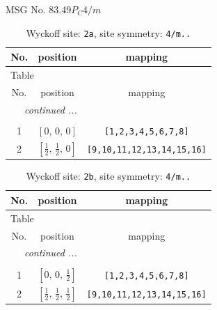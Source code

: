 \documentclass[fleqn,8pt]{jsarticle}
\begin{document}
\setcounter{MaxMatrixCols}{32}

\renewcommand{\tablename}{Table~}
\renewcommand{\figurename}{Figure~}
\begin{center}
\LARGE
MSG No. 83.49\quad$P_{C}4/m$
\end{center}
\renewcommand{\arraystretch}{1.2}
\begin{longtable}{ccc}
\caption{Wyckoff site: {\tt 2a}, site symmetry: {\tt 4/m..}}
 \\
 \hline \hline
No. & position & mapping \\ \hline \endfirsthead

\multicolumn{2}{l}{\tablename\ \thetable{}} \\
 \hline \hline
No. & position & mapping \\ \hline \endhead

 \hline \hline
\multicolumn{2}{r}{\footnotesize\it continued ...} \\ \endfoot

 \hline \hline
\multicolumn{2}{r}{} \\ \endlastfoot

1 & $\left[ 0,\, 0,\, 0 \right]$ & {\tt [1,2,3,4,5,6,7,8]} \\ \hline
2 & $\left[ \frac{1}{2},\, \frac{1}{2},\, 0 \right]$ & {\tt [9,10,11,12,13,14,15,16]} \\
\end{longtable}
\renewcommand{\arraystretch}{1.2}
\begin{longtable}{ccc}
\caption{Wyckoff site: {\tt 2b}, site symmetry: {\tt 4/m..}}
 \\
 \hline \hline
No. & position & mapping \\ \hline \endfirsthead

\multicolumn{2}{l}{\tablename\ \thetable{}} \\
 \hline \hline
No. & position & mapping \\ \hline \endhead

 \hline \hline
\multicolumn{2}{r}{\footnotesize\it continued ...} \\ \endfoot

 \hline \hline
\multicolumn{2}{r}{} \\ \endlastfoot

1 & $\left[ 0,\, 0,\, \frac{1}{2} \right]$ & {\tt [1,2,3,4,5,6,7,8]} \\ \hline
2 & $\left[ \frac{1}{2},\, \frac{1}{2},\, \frac{1}{2} \right]$ & {\tt [9,10,11,12,13,14,15,16]} \\
\end{longtable}
\end{document}

